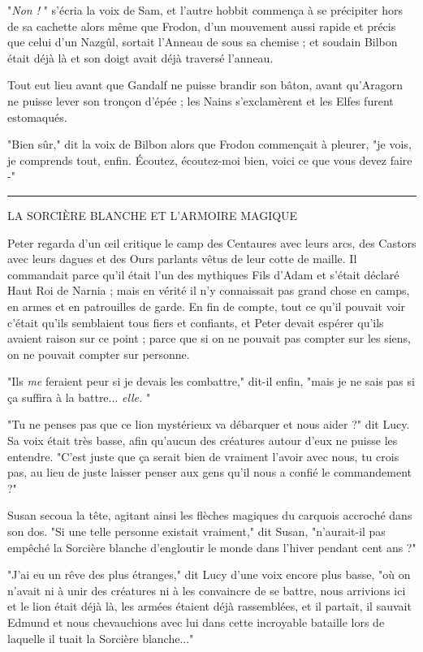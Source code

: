 "\emph{Non !} " s'écria la voix de Sam, et l'autre hobbit commença à se précipiter hors de sa cachette alors même que Frodon, d'un mouvement aussi rapide et précis que celui d'un Nazgûl, sortait l'Anneau de sous sa chemise ; et soudain Bilbon était déjà là et son doigt avait déjà traversé l'anneau.

Tout eut lieu avant que Gandalf ne puisse brandir son bâton, avant qu'Aragorn ne puisse lever son tronçon d'épée ; les Nains s'exclamèrent et les Elfes furent estomaqués.

"Bien sûr," dit la voix de Bilbon alors que Frodon commençait à pleurer, "je vois, je comprends tout, enfin. Écoutez, écoutez-moi bien, voici ce que vous devez faire -"
\par\noindent\rule{\textwidth}{0.4pt}

\begin{center}LA SORCIÈRE BLANCHE ET L'ARMOIRE MAGIQUE\end{center}


Peter regarda d'un œil critique le camp des Centaures avec leurs arcs, des Castors avec leurs dagues et des Ours parlants vêtus de leur cotte de maille. Il commandait parce qu'il était l'un des mythiques Fils d'Adam et s'était déclaré Haut Roi de Narnia ; mais en vérité il n'y connaissait pas grand chose en camps, en armes et en patrouilles de garde. En fin de compte, tout ce qu'il pouvait voir c'était qu'ils semblaient tous fiers et confiants, et Peter devait espérer qu'ils avaient raison sur ce point ; parce que si on ne pouvait pas compter sur les siens, on ne pouvait compter sur personne.

"Ils \emph{me}  feraient peur si je devais les combattre," dit-il enfin, "mais je ne sais pas si ça suffira à la battre... \emph{elle.} "

"Tu ne penses pas que ce lion mystérieux va débarquer et nous aider ?" dit Lucy. Sa voix était très basse, afin qu'aucun des créatures autour d'eux ne puisse les entendre. "C'est juste que ça serait bien de vraiment l'avoir avec nous, tu crois pas, au lieu de juste laisser penser aux gens qu'il nous a confié le commandement ?"

Susan secoua la tête, agitant ainsi les flèches magiques du carquois accroché dans son dos. "Si une telle personne existait vraiment," dit Susan, "n'aurait-il pas empêché la Sorcière blanche d'engloutir le monde dans l'hiver pendant cent ans ?"

"J'ai eu un rêve des plus étranges," dit Lucy d'une voix encore plus basse, "où on n'avait ni à unir des créatures ni à les convaincre de se battre, nous arrivions ici et le lion était déjà là, les armées étaient déjà rassemblées, et il partait, il sauvait Edmund et nous chevauchions avec lui dans cette incroyable bataille lors de laquelle il tuait la Sorcière blanche..."

